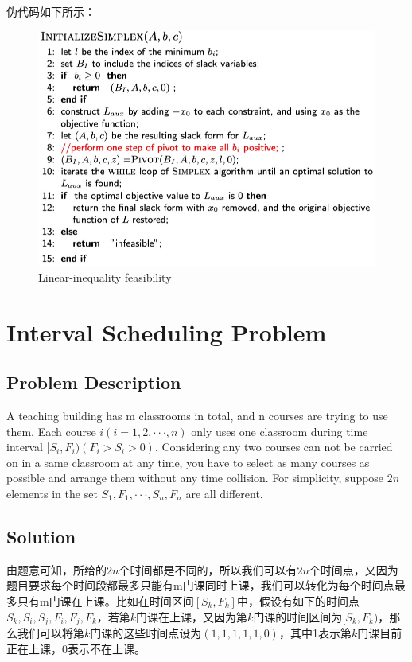 \documentclass[UTF8,a4paper,12pt]{article}
\begin{document}
\begin{CJK}{UTF8}{gkai}
		伪代码如下所示：
				\begin{figure}[htb]
			\centering
			\includegraphics[scale=.5]{./1.png}
			\caption{Linear-inequality feasibility}
		\end{figure}
	
	\newpage
	\section{Interval Scheduling Problem}
	\subsection{Problem Description}
		A teaching building has m classrooms in total, and n courses are trying to use them. Each course $ i (i = 1, 2, · · · , n) $ only uses one classroom during time interval $ [S_i , F_i ) (F_i > S_i > 0) $. Considering any two courses can not be carried on in a same classroom at any time, you have to select as many courses as possible and arrange them without any time collision. For simplicity, suppose $ 2n $ elements in the set $ {S_1 , F_1 , · · · , S_n , F_n } $ are all different.
	
	\subsection{Solution}
		由题意可知，所给的$ 2n $个时间都是不同的，所以我们可以有$ 2n $个时间点，又因为题目要求每个时间段都最多只能有m门课同时上课，我们可以转化为每个时间点最多只有m门课在上课。比如在时间区间$ [S_k,F_k] $中，假设有如下的时间点$ {S_k,S_i,S_j,F_i,F_j,F_k} $，若第$ k $门课在上课，又因为第$ k $门课的时间区间为$ [S_k,F_k) $，那么我们可以将第$ k $门课的这些时间点设为$ (1,1,1,1,1,0) $，其中1表示第$ k $门课目前正在上课，0表示不在上课。
		

\end{CJK}
\end{document}
